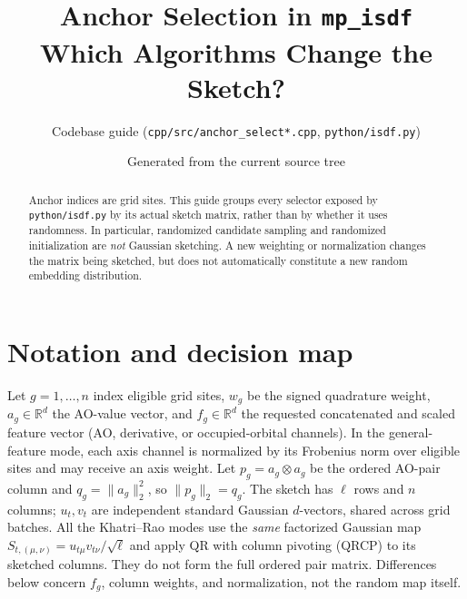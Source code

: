 \documentclass[10pt,a4paper]{article}
\title{Anchor Selection in \texttt{mp\_isdf}\\\large Which Algorithms Change the Sketch?}
\author{Codebase guide \quad (\texttt{cpp/src/anchor\_select*.cpp}, \texttt{python/isdf.py})}
\date{Generated from the current source tree}
\newcommand{\code}[1]{\texttt{#1}}
\begin{document}
\maketitle
\begin{abstract}
Anchor indices are grid sites. This guide groups every selector exposed by
\code{python/isdf.py} by its actual sketch matrix, rather than by whether it
uses randomness. In particular, randomized candidate sampling and randomized
initialization are \emph{not} Gaussian sketching. A new weighting or
normalization changes the matrix being sketched, but does not automatically
constitute a new random embedding distribution.
\end{abstract}

\section{Notation and decision map}
Let $g=1,\ldots,n$ index eligible grid sites, $w_g$ be the signed quadrature
weight, $a_g\in\mathbb R^d$ the AO-value vector, and $f_g\in\mathbb R^d$
the requested concatenated and scaled feature vector (AO, derivative, or
occupied-orbital channels). In the general-feature mode, each axis channel
is normalized by its Frobenius norm over eligible sites and may receive an
axis weight. Let $p_g=a_g\otimes a_g$ be the ordered AO-pair column and
$q_g=\|a_g\|_2^2$, so $\|p_g\|_2=q_g$. The sketch has $\ell$ rows and
$n$ columns; $u_t,v_t$ are independent standard Gaussian $d$-vectors, shared
across grid batches. All the Khatri--Rao modes use the \emph{same} factorized
Gaussian map $S_{t,(\mu,\nu)}=u_{t\mu}v_{t\nu}/\sqrt\ell$ and apply QR with
column pivoting (QRCP) to its sketched columns. They do not form the full
ordered pair matrix. Differences below concern $f_g$, column weights, and
normalization, not the random map itself.
\end{document}
